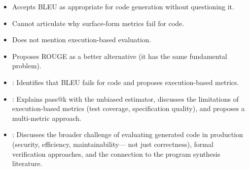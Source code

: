 \begin{interviewq}
\redflags
\begin{itemize}
    \item Accepts BLEU as appropriate for code generation without questioning it.
    \item Cannot articulate why surface-form metrics fail for code.
    \item Does not mention execution-based evaluation.
    \item Proposes ROUGE as a better alternative (it has the same fundamental
          problem).
\end{itemize}


\goodgreat
\begin{itemize}
    \item {}: Identifies that BLEU fails for code and proposes
          execution-based metrics.
    \item {}: Explains pass@k with the unbiased estimator, discusses
          the limitations of execution-based metrics (test coverage,
          specification quality), and proposes a multi-metric approach.
    \item {}: Discusses the broader challenge of evaluating
          generated code in production (security, efficiency, maintainability---
          not just correctness), formal verification approaches, and the
          connection to the program synthesis literature.
\end{itemize}

\end{interviewq}

\vspace{0.5em}

